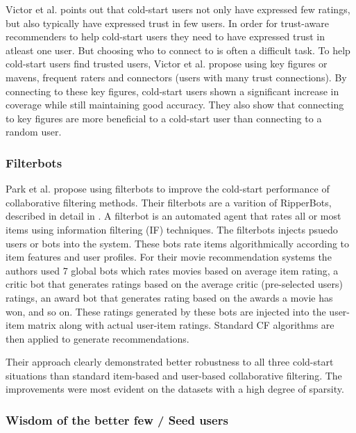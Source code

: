 Victor et al. \cite{Victor2008} points out that cold-start users not only have
expressed few ratings, but also typically have expressed trust in few users. In
order for trust-aware recommenders to help cold-start users they need to have
expressed trust in atleast one user. But choosing who to connect to is often a
difficult task. To help cold-start users find trusted users, Victor et al.
propose using key figures or mavens, frequent raters and connectors (users with
many trust connections). By connecting to these key figures, cold-start users
shown a significant increase in coverage while still maintaining good accuracy.
They also show that connecting to key figures are more beneficial to a
cold-start user than connecting to a random user.

\subsubsection{Filterbots}


Park et al. \cite{Park2006} propose using filterbots to improve the cold-start
performance of collaborative filtering methods. Their filterbots are a varition
of RipperBots, described in detail in \cite{Good1999}. A filterbot is an
automated agent that rates all or most items using information filtering (IF)
techniques. The filterbots injects psuedo users or bots into the system. These
bots rate items algorithmically according to item features and user profiles.
For their movie recommendation systems the authors used 7 global bots which
rates movies based on average item rating, a critic bot that generates ratings
based on the average critic (pre-selected users) ratings, an award bot that
generates rating based on the awards a movie has won, and so on. These ratings
generated by these bots are injected into the user-item matrix along with
actual user-item ratings. Standard CF algorithms are then applied to generate
recommendations.

Their approach clearly demonstrated better robustness to all three cold-start situations than standard item-based
and user-based collaborative filtering. The improvements were most evident on
the datasets with a high degree of sparsity.


\subsubsection{Wisdom of the better few / Seed users}

